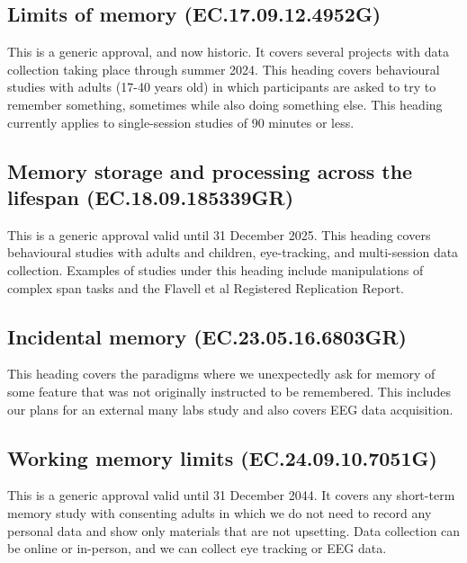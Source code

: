 \documentclass[
  12pt,
]{book}
\begin{document}
\subsection{Limits of memory (EC.17.09.12.4952G)}\label{limits-of-memory-ec.17.09.12.4952g}

This is a generic approval, and now historic. It covers several projects with data collection taking place through summer 2024. This heading covers behavioural studies with adults (17-40 years old) in which participants are asked to try to remember something, sometimes while also doing something else. This heading currently applies to single-session studies of 90 minutes or less.

\subsection{Memory storage and processing across the lifespan (EC.18.09.185339GR)}\label{memory-storage-and-processing-across-the-lifespan-ec.18.09.185339gr}

This is a generic approval valid until 31 December 2025. This heading covers behavioural studies with adults and children, eye-tracking, and multi-session data collection. Examples of studies under this heading include manipulations of complex span tasks and the Flavell et al Registered Replication Report.

\subsection{Incidental memory (EC.23.05.16.6803GR)}\label{incidental-memory-ec.23.05.16.6803gr}

This heading covers the paradigms where we unexpectedly ask for memory of some feature that was not originally instructed to be remembered. This includes our plans for an external many labs study and also covers EEG data acquisition.

\subsection{Working memory limits (EC.24.09.10.7051G)}\label{working-memory-limits-ec.24.09.10.7051g}

This is a generic approval valid until 31 December 2044. It covers any short-term memory study with consenting adults in which we do not need to record any personal data and show only materials that are not upsetting. Data collection can be online or in-person, and we can collect eye tracking or EEG data.
\end{document}
